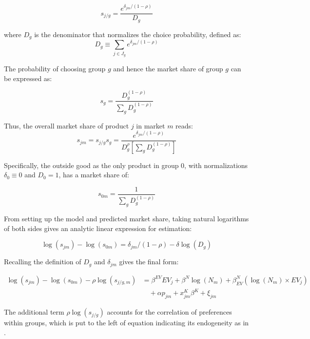 \documentclass[12pt]{article}
\begin{document}
\begin{equation}
    s_{j/g} = \frac{e^{\delta_{jm}/(1-\rho)}}{D_g}
\end{equation}

where $D_g$ is the denominator that normalizes the choice probability, defined as:
\begin{equation}
    D_g \equiv \sum_{j \in J_g} e^{\delta_{jm}/(1-\rho)}
\end{equation}

The probability of choosing group $g$ and hence the market share of group $g$ can be expressed as:

\begin{equation}
    s_{g} = \frac{D_g^{(1-\rho)}}{\sum_{g} D_g^{(1-\rho)}}
\end{equation}

Thus, the overall market share of product $j$ in market $m$ reads:
\begin{equation}
    s_{jm} = s_{j/g} s_g = \frac{e^{\delta_{jm}/(1-\rho)}}{D_g^\rho [\sum_{g} D_g^{(1-\rho)}]} 
\end{equation}

Specifically, the outside good as the only product in group 0, with normalizations $\delta_0 \equiv 0$ and $D_0 = 1$, has a market share of:

\begin{equation}
    s_{0m} = \frac{1}{\sum_{g} D_g^{(1-\rho)}}  
\end{equation}

From setting up the model and predicted market share, taking natural logarithms of both sides gives an analytic linear expression for estimation:

\begin{equation}
    \log(s_{jm}) - \log(s_{0m}) = \delta_{jm}/(1-\rho) - \delta\log(D_g)
\end{equation}

Recalling the definition of $D_g$ and $\delta_{jm}$ gives the final form:

\begin{equation}
\begin{aligned}
    \log(s_{jm}) - \log(s_{0m}) - \rho\log(s_{j/g, m}) &= \beta^{EV} EV_j+ \beta^N \log(N_m) + \beta^N_{EV} (\log(N_m) \times EV_j) \\
    &\quad + \alpha p_{jm} + x^{K}_{jm} \beta^{K} + \xi_{jm}
\end{aligned}
\end{equation}

The additional term $\rho\log(s_{j/g})$ accounts for the correlation of preferences within groups, which is put to the left of equation indicating its endogeneity as in \citet{conlon_best_2020}.  
\end{document}
